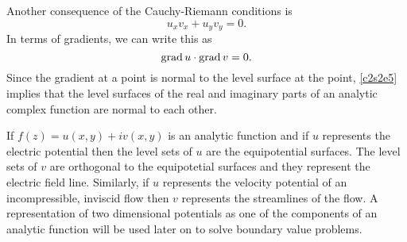 Another consequence of the Cauchy-Riemann conditions is 
\[
u_xv_x + u_yv_y = 0.
\]
In terms of gradients, we can write this as
\begin{equation}\label{c2s2e5}
\operatorname{grad} u \cdot \operatorname{grad} v = 0.
\end{equation}
Since the gradient at a point is normal to the level surface at the point,
\eqref{c2s2e5} implies that the level surfaces of the real and imaginary parts
of an analytic complex function are normal to each other.

If $f(z) = u(x, y) + iv(x, y)$ is an analytic function and if $u$ represents
the electric potential then the level sets of $u$ are the equipotential
surfaces. The level sets of $v$ are orthogonal to the equipotetial surfaces
and they represent the electric field line. Similarly, if $u$ represents the
velocity potential of an incompressible, inviscid flow then $v$ represents the
streamlines of the flow. A representation of two dimensional potentials as
one of the components of an analytic function will be used later on to solve
boundary value problems.

